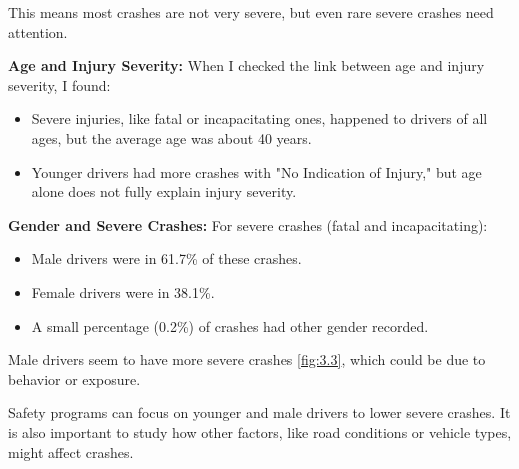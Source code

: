 \documentclass[a4paper,10pt]{article}
\begin{document}
This means most crashes are not very severe, but even rare severe crashes need attention. 


\textbf{Age and Injury Severity:}
When I checked the link between age and injury severity, I found:

\begin{itemize}
    \item Severe injuries, like fatal or incapacitating ones, happened to drivers of all ages, but the average age was about 40 years.
    \item Younger drivers had more crashes with "No Indication of Injury," but age alone does not fully explain injury severity.
\end{itemize}

\textbf{Gender and Severe Crashes:}
For severe crashes (fatal and incapacitating):

\begin{itemize}
    \item Male drivers were in 61.7\% of these crashes.
    \item Female drivers were in 38.1\%.
    \item A small percentage (0.2\%) of crashes had other gender recorded.
\end{itemize}
Male drivers seem to have more severe crashes \ref{fig:3.3}, which could be due to behavior or exposure. 


Safety programs can focus on younger and male drivers to lower severe crashes. It is also important to study how other factors, like road conditions or vehicle types, might affect crashes.
\end{document}
